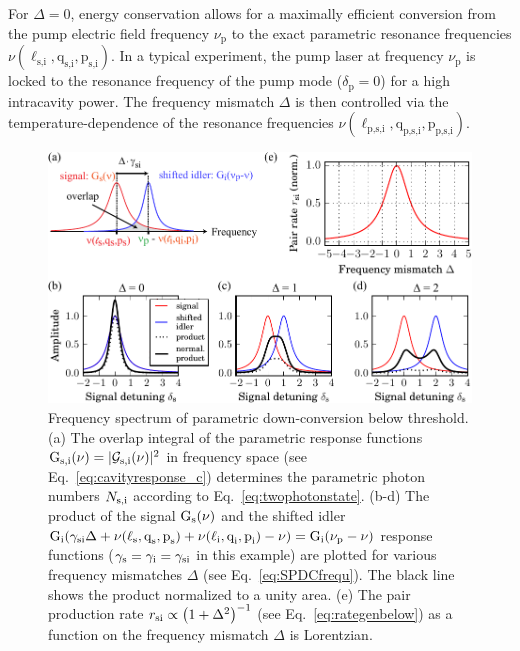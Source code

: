 \documentclass[aps,pra,showpacs,reprint,onecolumn,notitlepage]{revtex4-1}
\newcommand{\tx}[1]{\textnormal{#1}}
\begin{document}
For $\Delta=0$, energy conservation allows for a maximally efficient conversion from the pump electric field frequency $\nu_\textrm{p}$ to the exact parametric resonance frequencies $\nu (\ell_\textrm{s,i},\textrm{q}_\textrm{s,i},\textrm{p}_\textrm{s,i})$. In a typical experiment, the pump laser at frequency $\nu_\textrm{p}$ is locked to the resonance frequency of the pump mode ($\delta_\textrm{p}=0$) for a high intracavity power. The frequency mismatch $\Delta$ is then controlled via the temperature-dependence of the resonance frequencies $\nu (\ell_\textrm{p,s,i},\textrm{q}_\textrm{p,s,i},\textrm{p}_\textrm{p,s,i})$.
\begin{figure}[htb]
	\centering
	\includegraphics[scale=0.9]{pictures/teo_SPDC_spectrum/SPDC_spectrum_1.pdf}
	\caption{Frequency spectrum of parametric down-conversion below threshold. (a) The overlap integral of the parametric response functions $\tx{G}_\tx{s,i}(\nu) = |\mathcal{G}_\tx{s,i}(\nu)|^2$ in frequency space (see Eq.~\ref{eq:cavityresponse_c}) determines the parametric photon numbers $N_\tx{s,i}$ according to Eq.~\ref{eq:twophotonstate}. (b-d) The product of the signal $\tx{G}_\tx{s}(\nu)$ and the shifted idler $\tx{G}_\tx{i}(\gamma_\tx{si}\Delta + \nu (\ell_\textrm{s},\textrm{q}_\textrm{s},\textrm{p}_\textrm{s} ) +\nu (\ell_\textrm{i},\textrm{q}_\textrm{i},\textrm{p}_\textrm{i} ) -\nu) = \tx{G}_\tx{i}(\nu_\tx{p}-\nu)$ response functions ($\gamma_\tx{s}=\gamma_\tx{i} = \gamma_\tx{si}$ in this example) are plotted for various frequency mismatches $\Delta$ (see Eq.~\ref{eq:SPDCfrequ}). The black line shows the product normalized to a unity area. (e) The pair production rate ${r_\tx{si} \propto \left( 1+\Delta^2 \right)^{-1}}$ (see Eq.~\ref{eq:rategenbelow}) as a function on the frequency mismatch $\Delta$  is Lorentzian.} 
	\label{fig:spdc_spectrum}
\end{figure}
\end{document}
